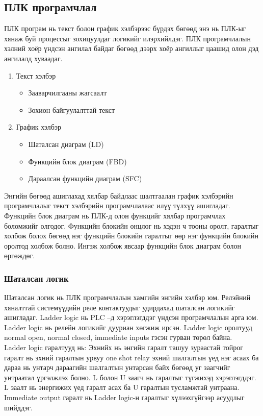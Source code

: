 \subsection{ПЛК програмчлал}
ПЛК програм нь текст болон график хэлбэрээс бүрдэх бөгөөд энэ нь ПЛК-ыг хянаж буй процессыг зохицуулдаг логикийг илэрхийлдэг. ПЛК програмчлалын хэлний хоёр үндсэн ангилал байдаг бөгөөд дээрх хоёр ангиллыг цаашид олон дэд ангилалд хуваадаг. 
\begin{enumerate}
	\item Текст хэлбэр 
	\begin{itemize}
		\item Зааварчилгааны жагсаалт 
		\item Зохион байгуулалттай текст 
	\end{itemize}
\item График хэлбэр 
\begin{itemize}
	\item 	Шаталсан диаграм (LD)
	\item Функцийн блок диаграм (FBD)
	\item Дараалсан функцийн диаграм (SFC)
\end{itemize}
\end{enumerate}
Энгийн бөгөөд ашиглахад хялбар байдлаас шалтгаалан график хэлбэрийн програмчлалыг текст хэлбэрийн програмчлалаас илүү түлхүү ашигладаг. 
Функцийн блок диаграм нь ПЛК-д олон функцийг хялбар програмчлах боломжийг олгодог. Функцийн блокийн онцлог нь хэдэн ч тооны оролт, гаралтыг холбож болох бөгөөд нэг функцийн блокийн гаралтыг өөр нэг функцийн блокийн оролтод холбож болно. Ингэж холбож явсаар функцийн блок диаграм болон өргөждөг.

\subsubsection{Шаталсан логик}
Шаталсан логик нь ПЛК програмчлалын хамгийн энгийн хэлбэр юм. Релэйний хяналттай системүүдийн реле контактуудыг удирдахад шаталсан логикийг ашигладаг. Ladder logic нь PLC –д хэрэглэгддэг үндсэн програмчлалын арга юм. Ladder logic нь релейн логикийг дууриан хөгжиж ирсэн. Ladder logic оролтууд normal open, normal closed, immediate inputs гэсэн гурван төрөл байна. \cite{EE343}\\

 Ladder logic гаралтууд нь: 
Эхнийх нь энгийн гаралт ташуу зураастай тойрог гаралт нь эхний гаралтын урвуу one shot relay эхний шалгалтын үед нэг асаах ба дараа нь унтарч дараагийн шалгалтын унтарсан байх бөгөөд уг заагчийг унтраатал үргэлжлэх болно. L болон U заагч нь гаралтыг түгжихэд хэрэглэгддэг. L заалт нь энергижих үед гаралт асах ба U гаралтын тусламжтай унтраана. Immediate output гаралт нь Ladder logic-н гаралтыг хүлээхгүйгээр асуудлыг шийддэг.

